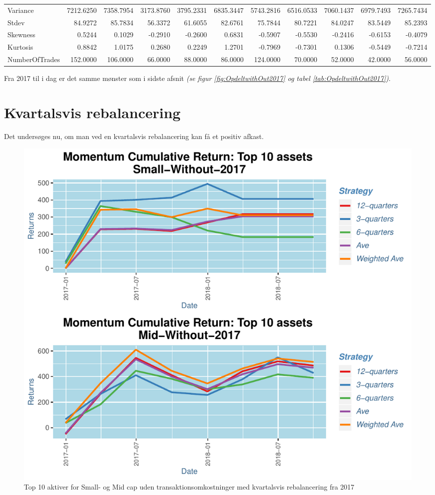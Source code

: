 \documentclass[]{article}
\begin{document}
\begin{table}
{\begin{tabular}[t]{lrrrrrrrrrr}
Variance & 7212.6250 & 7358.7954 & 3173.8760 & 3795.2331 & 6835.3447 & 5743.2816 & 6516.0533 & 7060.1437 & 6979.7493 & 7265.7434\\
Stdev & 84.9272 & 85.7834 & 56.3372 & 61.6055 & 82.6761 & 75.7844 & 80.7221 & 84.0247 & 83.5449 & 85.2393\\
Skewness & 0.5244 & 0.1029 & -0.2910 & -0.2600 & 0.6831 & -0.5907 & -0.5530 & -0.2416 & -0.6153 & -0.4079\\
\addlinespace
Kurtosis & 0.8842 & 1.0175 & 0.2680 & 0.2249 & 1.2701 & -0.7969 & -0.7301 & 0.1306 & -0.5449 & -0.7214\\
NumberOfTrades & 152.0000 & 106.0000 & 66.0000 & 88.0000 & 86.0000 & 124.0000 & 70.0000 & 52.0000 & 42.0000 & 56.0000\\
\bottomrule
\end{tabular}}
\end{table}

Fra 2017 til i dag er det samme mønster som i sidste afsnit \emph{(se
figur \ref{fig:OpdeltwithOut2017} og tabel
\ref{tab:OpdeltwithOut2017})}.

\hypertarget{kvartalsvis-rebalancering}{%
\section{Kvartalsvis rebalancering}\label{kvartalsvis-rebalancering}}

Det undersøges nu, om man ved en kvartalsvis rebalancering kan få et
positiv afkast.

\begin{figure}
\centering
\includegraphics{IPA_Small_and_Mid_files/figure-latex/fig3-1.pdf}
\caption{\label{fig:OpdeltwithOut2017Q}Top 10 aktiver for Small- og Mid
cap uden transaktionsomkostninger med kvartalsvis rebalancering fra
2017}
\end{figure}
\end{document}
